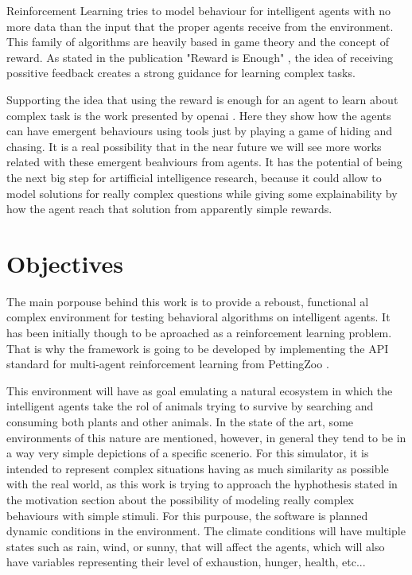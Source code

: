 Reinforcement Learning tries to model behaviour for intelligent agents with no more data than the input that the proper agents receive from the environment. This family of algorithms are heavily based in game theory and the concept of reward. As stated in the publication "Reward is Enough"  \cite{rewardIsEnough}, the idea of receiving possitive feedback creates a strong guidance for learning complex tasks.

Supporting the idea that using the reward is enough for an agent to learn about complex task is the work presented by openai \cite{multiAgentAutocurricula}. Here they show how the agents can have emergent behaviours using tools just by playing a game of hiding and chasing. It is a real possibility that in the near future we will see more works related with these emergent beahviours from agents. It has the potential of being the next big step for artifficial intelligence research, because it could allow to model solutions for really complex questions while giving some explainability by how the agent reach that solution from apparently simple rewards.

\section{Objectives}

The main porpouse behind this work is to provide a reboust, functional al complex environment for testing behavioral algorithms on intelligent agents. It has been initially though to be aproached as a reinforcement learning problem. That is why the framework is going to be developed by implementing the API standard for multi-agent reinforcement learning from PettingZoo \cite{pettingzoo}.

This environment will have as goal emulating a natural ecosystem in which the intelligent agents take the rol of animals trying to survive by searching and consuming both plants and other animals. In the state of the art, some environments of this nature are mentioned, however, in general they tend to be in a way very simple depictions of a specific scenerio. For this simulator, it is intended to represent complex situations having as much similarity as possible with the real world, as this work is trying to approach the hyphothesis stated in the motivation section about the possibility of modeling really complex behaviours with simple stimuli. For this purpouse, the software is planned dynamic conditions in the environment. The climate conditions will have multiple states such as rain, wind, or sunny, that will affect the agents, which will also have variables representing their level of exhaustion, hunger, health, etc...

